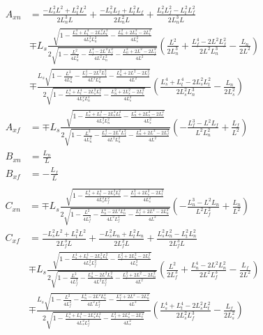 \documentclass[11pt, landscape]{article}
\begin{document}
\begin{align}
  A_{xn} &= \frac{-L_s^2L^2 + L_t^2L^2}{2L_n^3L} + \frac{-L_s^2L_{f} + L_t^2L_{f}}{2L_n^2L} + \frac{L_s^2L_{f}^2 - L_t^2L_{f}^2}{2L_n^3L}\\
  &\mp L_s\frac{\sqrt{1 - \frac{L_s^4 + L_t^4 - 2L_s^2L_t^2}{4L_{s}^2L_{n}^2} - \frac{L_n^2 + 2L_s^2 - 2L_t^2}{4L_s^2}}}{2\sqrt{1 - \frac{L^2}{4L_n^2} - \frac{L_f^4 - 2L^2L_f^2}{4L^2L_n^2} - \frac{L_n^2 + 2L^2 - 2L_f^2}{4L^2}}}\left(\frac{L^2}{2L_n^3} + \frac{L_f^4 - 2L^2L_f^2}{2L^2L_n^3} - \frac{L_n}{2L^2}\right)\\
  &\mp \frac{L_s\sqrt{1 - \frac{L^2}{4L_n^2} - \frac{L_f^4 - 2L^2L_f^2}{4L^2L_n^2} - \frac{L_n^2 + 2L^2 - 2L_f^2}{4L^2}}}{2\sqrt{1 - \frac{L_s^4 + L_t^4 - 2L_s^2L_t^2}{4L_{s}^2L_{n}^2} - \frac{L_n^2 + 2L_s^2 - 2L_t^2}{4L_s^2}}}
  \left(\frac{L_s^4 + L_t^4 - 2L_s^2L_t^2}{2L_{s}^2L_{n}^3} - \frac{L_n}{2L_s^2}\right)\\
  A_{xf} &= \mp L_s\frac{\sqrt{1 - \frac{L_s^4 + L_t^4 - 2L_s^2L_t^2}{4L_{s}^2L_{n}^2} - \frac{L_n^2 + 2L_s^2 - 2L_t^2}{4L_s^2}}}{2\sqrt{1 - \frac{L^2}{4L_n^2} - \frac{L_f^4 - 2L^2L_f^2}{4L^2L_n^2} - \frac{L_n^2 + 2L^2 - 2L_f^2}{4L^2}}}\left(-\frac{L_f^3 - L^2L_f}{L^2L_n^2} + \frac{L_f}{L^2}\right)\\
  B_{xn} &= \frac{L_n}{L}\\
  B_{xf} &= - \frac{L_f}{L}\\
\end{align}
\begin{align}
  C_{xn} &= \mp L_s\frac{\sqrt{1 - \frac{L_s^4 + L_t^4 - 2L_s^2L_t^2}{4L_{s}^2L_f^2} - \frac{L_f^2 + 2L_s^2 - 2L_t^2}{4L_s^2}}}{2\sqrt{1 - \frac{L^2}{4L_f^2} - \frac{L_n^4 - 2L^2L_n^2}{4L^2L_f^2} - \frac{L_f^2 + 2L^2 - 2L_n^2}{4L^2}}}\left(-\frac{L_n^3 - L^2L_n}{L^2L_f^2} + \frac{L_n}{L^2}\right)\\
  C_{xf} &= \frac{-L_s^2L^2 + L_t^2L^2}{2L_f^3L} + \frac{-L_s^2L_n + L_t^2L_n}{2L_f^2L} + \frac{L_s^2L_n^2 - L_t^2L_n^2}{2L_f^3L}\\
  &\mp L_s\frac{\sqrt{1 - \frac{L_s^4 + L_t^4 - 2L_s^2L_t^2}{4L_{s}^2L_f^2} - \frac{L_f^2 + 2L_s^2 - 2L_t^2}{4L_s^2}}}{2\sqrt{1 - \frac{L^2}{4L_f^2} - \frac{L_n^4 - 2L^2L_n^2}{4L^2L_f^2} - \frac{L_f^2 + 2L^2 - 2L_n^2}{4L^2}}}\left(\frac{L^2}{2L_f^3} + \frac{L_n^4 - 2L^2L_n^2}{2L^2L_f^3} - \frac{L_f}{2L^2}\right)\\
  &\mp \frac{L_s\sqrt{1 - \frac{L^2}{4L_f^2} - \frac{L_n^4 - 2L^2L_n^2}{4L^2L_f^2} - \frac{L_f^2 + 2L^2 - 2L_n^2}{4L^2}}}{2\sqrt{1 - \frac{L_s^4 + L_t^4 - 2L_s^2L_t^2}{4L_{s}^2L_f^2} - \frac{L_f^2 + 2L_s^2 - 2L_t^2}{4L_s^2}}}
  \left(\frac{L_s^4 + L_t^4 - 2L_s^2L_t^2}{2L_{s}^2L_f^3} - \frac{L_f}{2L_s^2}\right)\\
\end{align}
\end{document}
